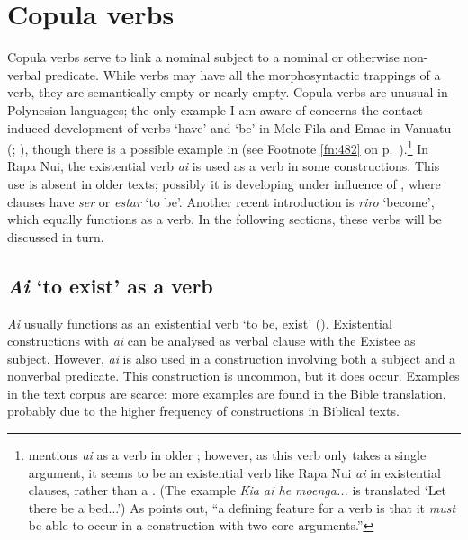\section{Copula verbs}\label{sec:9.6}
Copula verbs serve to link a nominal subject to a nominal or otherwise non-verbal predicate. While  verbs may have all the morphosyntactic trappings of a verb, they are semantically empty \citep[115]{Payne1997} or nearly empty. 
Copula verbs are unusual in Polynesian languages; the only example I am aware of concerns the contact-induced development of verbs ‘have’ and ‘be’ in Mele-Fila and Emae in Vanuatu (\citealt[337]{Clark1986}; \citealt[119]{Clark1994}), though there is a possible example in  (see Footnote \ref{fn:482} on p.~\pageref{fn:482}).\footnote{\label{fn:480}\citet[154]{Harlow2007Maori} mentions \textit{ai} as a  verb in older ; however, as this verb only takes a single argument, it seems to be an existential verb like Rapa Nui \textit{ai} in existential clauses, rather than a . (The example \textit{Kia ai he moenga...} is translated ‘Let there be a bed...’) As \citet[160]{Dixon2010-2} points out, “a defining feature for a  verb is that it \textit{must} be able to occur in a construction with two core arguments.”}  In Rapa Nui, the existential verb \textit{ai} is used as a  verb in some constructions. This use is absent in older texts; possibly it is developing under influence of , where  clauses have \textit{ser} or \textit{estar} ‘to be’. Another recent introduction is \textit{riro} ‘become’, which equally functions as a  verb. In the following sections, these verbs will be discussed in turn.

\subsection{\textit{Ai} ‘to exist’ as a  verb}\label{sec:9.6.1}

\textit{Ai} usually functions as an existential verb ‘to be, exist’ (). Existential constructions with \textit{ai} can be analysed as  verbal clause with the Existee as subject. However, \textit{ai} is also used in a construction involving both a subject and a nonverbal predicate. This construction is uncommon, but it does occur. Examples in the text corpus are scarce; more examples are found in the Bible translation, probably due to the higher frequency of  constructions in Biblical texts.

